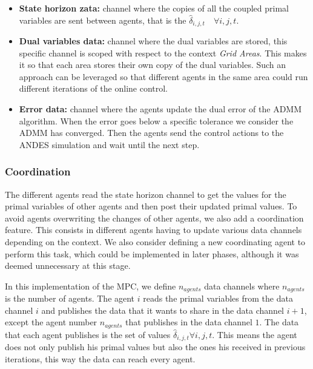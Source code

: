\documentclass{article}
\begin{document}
\begin{itemize}
    \item \textbf{State horizon zata:} channel where the copies of all the coupled primal variables are sent between agents, that is the $\hat{\delta}_{i,j,t} \quad \forall i,j,t$.
    \item \textbf{Dual variables data:} channel where the dual variables are stored, this specific channel is scoped with respect to the context \textit{Grid Areas}. This makes it so that each area stores their own copy of the dual variables. Such an approach can be leveraged so that different agents in the same area could run different iterations of the online control.
    \item \textbf{Error data:} channel where the agents update the dual error of the ADMM algorithm. When the error goes below a specific tolerance we consider the ADMM has converged. Then the agents send the control actions to the ANDES simulation and wait until the next step.
\end{itemize}

\subsubsection*{Coordination}

The different agents read the state horizon channel to get the values for the primal variables of other agents and then post their updated primal values. To avoid agents overwriting the changes of other agents, we also add a coordination feature. This consists in different agents having to update various data channels depending on the context. We also consider defining a new coordinating agent to perform this task, which could be implemented in later phases, although it was deemed unnecessary at this stage.

In this implementation of the MPC, we define $n_{agents}$ data channels where $n_{agents}$ is the number of agents. The agent $i$ reads the primal variables from the data channel $i$ and publishes the data that it wants to share in the data channel $i+1$, except the agent number $n_{agents}$ that publishes in the data channel $1$. The data that each agent publishes is the set of values $\hat{\delta}_{i,j,t} \forall i,j,t$. This means the agent does not only publish his primal values but also the ones his received in previous iterations, this way the data can reach every agent. 
\end{document}
